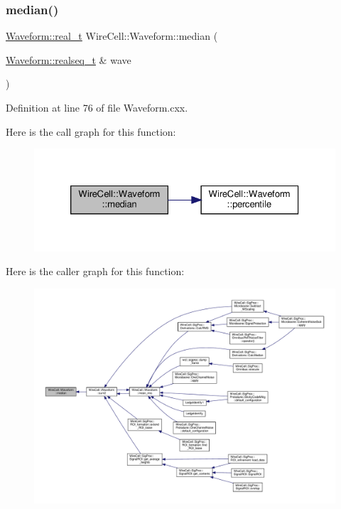 \subsubsection{\texorpdfstring{median()}{median()}}
{\footnotesize\ttfamily \hyperlink{namespace_wire_cell_1_1_waveform_a47570354e4599d8387803188186aba1f}{Waveform\+::real\+\_\+t} Wire\+Cell\+::\+Waveform\+::median (\begin{DoxyParamCaption}\item[{\hyperlink{namespace_wire_cell_1_1_waveform_a479175e541c8545e87cd8063b74b6956}{Waveform\+::realseq\+\_\+t} \&}]{wave }\end{DoxyParamCaption})}



Definition at line 76 of file Waveform.\+cxx.

Here is the call graph for this function\+:
\nopagebreak
\begin{figure}[H]
\begin{center}
\leavevmode
\includegraphics[width=326pt]{namespace_wire_cell_1_1_waveform_af5e9352cbf35ddaf2f95e924d241a2aa_cgraph}
\end{center}
\end{figure}
Here is the caller graph for this function\+:
\nopagebreak
\begin{figure}[H]
\begin{center}
\leavevmode
\includegraphics[width=350pt]{namespace_wire_cell_1_1_waveform_af5e9352cbf35ddaf2f95e924d241a2aa_icgraph}
\end{center}
\end{figure}
\mbox{\label{namespace_wire_cell_1_1_waveform_a9a72f0b40ec9e5b44713c59f338f6fd3}} 
